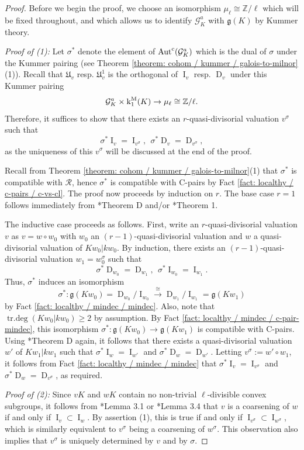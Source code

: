 \documentclass[11pt]{amsart}
\theoremstyle{definition}
\theoremstyle{remark}
\numberwithin{equation}{section}
\DeclareMathOperator{\Aut}{Aut}
\DeclareMathOperator{\trdeg}{tr.deg}
\DeclareMathOperator{\D}{D}
\DeclareMathOperator{\I}{I}
\newcommand{\Z}{\mathbb{Z}}
\newcommand{\Gc}{\mathcal{G}}
\newcommand{\Rcal}{\mathcal{R}}
\newcommand{\Ufrak}{\mathfrak{U}}
\newcommand{\gfrak}{\mathfrak{g}}
\newcommand{\Autc}{\Aut^{\rm c}}
\renewcommand{\k}{\operatorname{k}^{\rm M}}
\begin{document}
\begin{proof}
  Before we begin the proof, we choose an isomorphism $\mu_\ell \cong \Z/\ell$ which will be fixed throughout, and which allows us to identify $\Gc_K^a$ with $\gfrak(K)$ by Kummer theory.

  \vskip 5pt
  \emph{Proof of (1):}
  Let $\sigma^*$ denote the element of $\Autc(\Gc_K^a)$ which is the dual of $\sigma$ under the Kummer pairing (see Theorem \ref{theorem: cohom / kummer / galois-to-milnor}(1)).
  Recall that $\Ufrak_v$ resp. $\Ufrak_v^1$ is the orthogonal of $\I_v$ resp. $\D_v$ under this Kummer pairing
  \[ \Gc_K^a \times \k_1(K) \rightarrow \mu_\ell \cong \Z/\ell. \]
  Therefore, it suffices to show that there exists an $r$-quasi-divisorial valuation $v^\sigma$ such that
  \[ \sigma^*\I_v = \I_{v^\sigma}, \ \ \sigma^*\D_v = \D_{v^\sigma}, \]
  as the uniqueness of this $v^\sigma$ will be discussed at the end of the proof.

  Recall from Theorem \ref{theorem: cohom / kummer / galois-to-milnor}(1) that $\sigma^*$ is compatible with $\Rcal$, hence $\sigma^*$ is compatible with C-pairs by Fact \ref{fact: localthy / c-pairs / c-vs-cl}.
  The proof now proceeds by induction on $r$.
  The base case $r = 1$ follows immediately from \cite{Topaz:2015}*{Theorem D} and/or \cite{Pop:2010a}*{Theorem 1}.

  The inductive case proceeds as follows.
  First, write an $r$-quasi-divisorial valuation $v$ as $v = w \circ w_0$ with $w_0$ an $(r-1)$-quasi-divisorial valuation and $w$ a quasi-divisorial valuation of $Kw_0|kw_0$.
  By induction, there exists an $(r-1)$-quasi-divisorial valuation $w_1 = w_0^\sigma$ such that
  \[ \sigma^* \D_{w_0} = \D_{w_1},\ \ \sigma^*\I_{w_0} = \I_{w_1}. \]
  Thus, $\sigma^*$ induces an isomorphism
  \[ \sigma^* : \gfrak(Kw_0) = \D_{w_0}/\I_{w_0} \xrightarrow{\cong} \D_{w_1}/\I_{w_1} = \gfrak(Kw_1) \]
  by Fact \ref{fact: localthy / mindec / mindec}.
  Also, note that $\trdeg(Kw_0|kw_0) \geq 2$ by assumption.
  By Fact \ref{fact: localthy / mindec / c-pair-mindec}, this isomorphism $\sigma^* : \gfrak(Kw_0) \rightarrow \gfrak(Kw_1)$ is compatible with C-pairs.
  Using \cite{Topaz:2015}*{Theorem D} again, it follows that there exists a quasi-divisorial valuation $w'$ of $Kw_1|kw_1$ such that $\sigma^* \I_w = \I_{w'}$ and $\sigma^* \D_w = \D_{w'}$.
  Letting $v^\sigma := w' \circ w_1$, it follows from Fact \ref{fact: localthy / mindec / mindec} that $\sigma^* \I_v = \I_{v^\sigma}$ and $\sigma^*\D_w = \D_{v^\sigma}$, as required.

  \vskip 5pt
  \emph{Proof of (2):}
  Since $vK$ and $wK$ contain no non-trivial $\ell$-divisible convex subgroups, it follows from \cite{Topaz:2015}*{Lemma 3.1} or \cite{Topaz:2013a}*{Lemma 3.4} that $v$ is a coarsening of $w$ if and only if $\I_v \subset \I_w$.
  By assertion (1), this is true if and only if $\I_{v^\sigma} \subset \I_{w^\sigma}$, which is similarly equivalent to $v^\sigma$ being a coarsening of $w^\sigma$.
  This observation also implies that $v^\sigma$ is uniquely determined by $v$ and by $\sigma$.
\end{proof}
\end{document}
